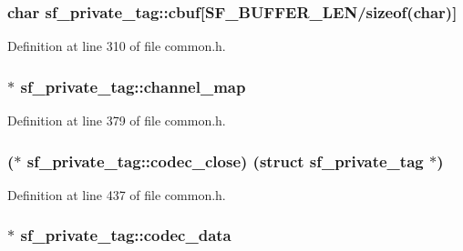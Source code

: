 \subsubsection[{\texorpdfstring{cbuf}{cbuf}}]{\setlength{\rightskip}{0pt plus 5cm}char sf\+\_\+private\+\_\+tag\+::cbuf\mbox{[}{\bf S\+F\+\_\+\+B\+U\+F\+F\+E\+R\+\_\+\+L\+EN}/sizeof(char)\mbox{]}}\hypertarget{structsf__private__tag_aa0c3daabbf209881fe2a0ca6f66f9fe7}{}\label{structsf__private__tag_aa0c3daabbf209881fe2a0ca6f66f9fe7}


Definition at line 310 of file common.\+h.

\subsubsection[{\texorpdfstring{channel\+\_\+map}{channel_map}}]{$\ast$ sf\+\_\+private\+\_\+tag\+::channel\+\_\+map}\hypertarget{structsf__private__tag_a58c199a38ca7869b337113a082d778c7}{}\label{structsf__private__tag_a58c199a38ca7869b337113a082d778c7}


Definition at line 379 of file common.\+h.

\subsubsection[{\texorpdfstring{codec\+\_\+close}{codec_close}}]{($\ast$ sf\+\_\+private\+\_\+tag\+::codec\+\_\+close) (struct {\bf sf\+\_\+private\+\_\+tag} $\ast$)}\hypertarget{structsf__private__tag_aa91db70373a3fdbedf87d0dc17750045}{}\label{structsf__private__tag_aa91db70373a3fdbedf87d0dc17750045}


Definition at line 437 of file common.\+h.

\subsubsection[{\texorpdfstring{codec\+\_\+data}{codec_data}}]{$\ast$ sf\+\_\+private\+\_\+tag\+::codec\+\_\+data}\hypertarget{structsf__private__tag_a266b8812fba304c9f79c9b0d8af7d7cd}{}\label{structsf__private__tag_a266b8812fba304c9f79c9b0d8af7d7cd}


